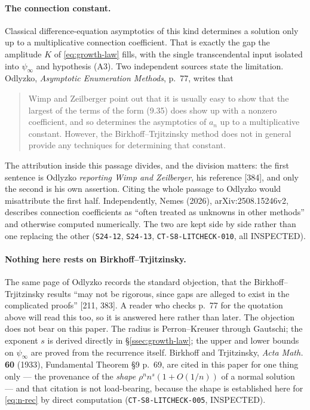 \paragraph{The connection constant.} Classical difference-equation asymptotics
of this kind determines a solution only up to a multiplicative connection
coefficient. That is exactly the gap the amplitude $K$ of
\eqref{eq:growth-law} fills, with the single transcendental input isolated into
$\psi_\infty$ and hypothesis (A3). Two independent sources state the limitation.
Odlyzko, \emph{Asymptotic Enumeration Methods}, p.~77, writes that
\begin{quote}
Wimp and Zeilberger point out that it is usually easy to show that the largest
of the terms of the form (9.35) does show up with a nonzero coefficient, and so
determines the asymptotics of $a_n$ up to a multiplicative constant. However,
the Birkhoff--Trjitzinsky method does not in general provide any techniques for
determining that constant.
\end{quote}
The attribution inside this passage divides, and the division matters: the first
sentence is Odlyzko \emph{reporting Wimp and Zeilberger}, his reference [384],
and only the second is his own assertion. Citing the whole passage to Odlyzko
would misattribute the first half. Independently, Nemes (2026),
arXiv:2508.15246v2, describes connection coefficients as ``often treated as
unknowns in other methods'' and otherwise computed numerically. The two are kept
side by side rather than one replacing the other
(\texttt{S24-12}, \texttt{S24-13}, \texttt{CT-S8-LITCHECK-010}, all INSPECTED).

\paragraph{Nothing here rests on Birkhoff--Trjitzinsky.} The same page of
Odlyzko records the standard objection, that the Birkhoff--Trjitzinsky results
``may not be rigorous, since gaps are alleged to exist in the complicated
proofs'' [211, 383]. A reader who checks p.~77 for the quotation above will read
this too, so it is answered here rather than later. The objection does not bear
on this paper. The radius is Perron--Kreuser through Gautschi; the exponent $s$
is derived directly in \S\ref{ssec:growth-law}; the upper and lower bounds on
$\psi_\infty$ are proved from the recurrence itself. Birkhoff and Trjitzinsky,
\emph{Acta Math.} \textbf{60} (1933), Fundamental Theorem \S9 p.~69, are cited
in this paper for one thing only --- the provenance of the \emph{shape}
$\rho^{n}n^{s}(1+O(1/n))$ of a normal solution --- and that citation is not
load-bearing, because the shape is established here for \eqref{eq:n-rec} by
direct computation (\texttt{CT-S8-LITCHECK-005}, INSPECTED).

